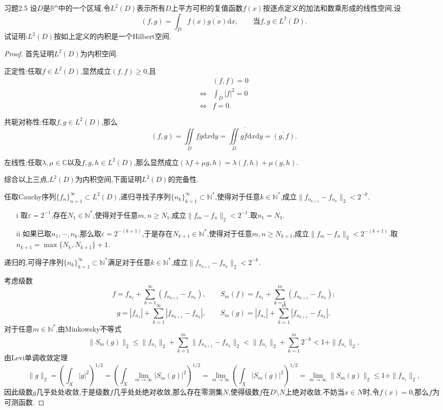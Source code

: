 \documentclass[lang = cn, scheme = chinese]{elegantbook}
\begin{document}
	\begin{proposition}{习题2.5}
		设$D$是$\mathbb{R}^n$中的一个区域.令$L^2(D)$表示所有$D$上平方可积的复值函数$f(x)$按逐点定义的加法和数乘形成的线性空间,设
		$$
		(f,g)=\int_D f(x) \overline{g(x)} \mathrm{d}x,\qquad \text{当}f,g\in L^2(D).
		$$
		试证明:$L^2(D)$按如上定义的内积是一个Hilbert空间.
	\end{proposition}
	
	\begin{proof}
		首先证明$L^2(D)$为内积空间.
		
		正定性:任取$f\in L^2(D)$,显然成立$(f,f)\ge 0$,且
		\begin{align*}
			&(f,f)=0\\
			\iff &\int_{D}|f|^2=0\\
			\iff &f=0.
		\end{align*}
		
		共轭对称性:任取$f,g\in L^2(D)$,那么
		$$
		(f,g)=\iint\limits_{D}f\overline{g}\mathrm{d}x\mathrm{d}y=\overline{\iint\limits_{D}g\overline{f}\mathrm{d}x\mathrm{d}y}=\overline{(g,f)}.
		$$
		
		左线性:任取$\lambda,\mu\in \mathbb{C}$以及$f,g,h\in L^2(D)$,那么显然成立$(\lambda f+\mu g,h)=\lambda(f,h)+\mu(g,h)$.
		
		综合以上三点,$L^2(D)$为内积空间,下面证明$L^2(D)$的完备性.
		
		任取Cauchy序列$\{f_n\}_{n=1}^\infty\subset L^2(D)$,递归寻找子序列$\{ n_k \}_{k=1}^{\infty}\subset\mathbb{N}^*$,使得对于任意$k\in\mathbb{N}^*$,成立$\| f_{n_{k+1}}-f_{n_k} \|_2<2^{-k}$.
		
		\begin{enumerate}
			\item[i] 取$\varepsilon=2^{-1}$,存在$N_1\in\mathbb{N}^*$,使得对于任意$m,n\ge N_1$,成立$\|f_m-f_n\|_2<2^{-1}$.取$n_1=N_1$.
			
			\item[ii] 如果已取$n_1,\cdots,n_k$,那么取$\varepsilon=2^{-(k+1)}$,于是存在$N_{k+1}\in\mathbb{N}^*$,使得对于任意$m,n\ge N_{k+1}$,成立$\|f_m-f_n\|_2<2^{-(k+1)}$.取$n_{k+1}=\max\{ N_{k},N_{k+1} \}+1$.
		\end{enumerate}
		
		递归的,可得子序列$\{ n_k \}_{k=1}^{\infty}\subset\mathbb{N}^*$满足对于任意$k\in\mathbb{N}^*$,成立$\| f_{n_{k+1}}-f_{n_k} \|_2<2^{-k}$.
		
		考虑级数
		$$
		f=f_{n_1}+\sum_{k=1}^{\infty}(f_{n_{k+1}}-f_{n_k}),\qquad
		S_m(f)=f_{n_1}+\sum_{k=1}^{m}(f_{n_{k+1}}-f_{n_k});
		$$
		$$
		g=|f_{n_1}|+\sum_{k=1}^{\infty}|f_{n_{k+1}}-f_{n_k}|,\qquad
		S_m(g)=|f_{n_1}|+\sum_{k=1}^{m}|f_{n_{k+1}}-f_{n_k}|,
		$$
		对于任意$m\in\mathbb{N}^*$,由Minkowsky不等式
		$$
		\|S_m(g)\|_2
		\le \|f_{n_1}\|_2+\sum_{k=1}^{m}\| f_{n_{k+1}}-f_{n_k}\|_2
		< \|f_{n_1}\|_2+\sum_{k=1}^{m}2^{-k}
		<1+\|f_{n_1}\|_2,
		$$
		由Levi单调收敛定理
		$$
		\|g\|_2
		=\left(\int_X |g|^2\right)^{1/2}
		=\left(\int_X \lim_{m\to\infty} |S_m(g)|^2\right)^{1/2}
		=\lim_{m\to\infty}\left(\int_X |S_m(g)|^2\right)^{1/2}
		=\lim_{m\to\infty}\|S_m(g)\|_2
		\le 1+\|f_{n_1}\|_2,
		$$
		因此级数$g$几乎处处收敛,于是级数$f$几乎处处绝对收敛,那么存在零测集$N$,使得级数$f$在$D\setminus N$上绝对收敛.不妨当$x\in N$时,令$f(x)=0$,那么$f$为可测函数.
		

\end{proof}
\end{document}
